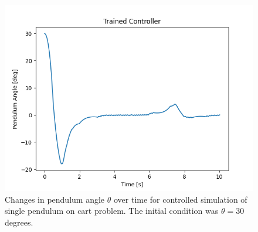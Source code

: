 \documentclass{LTHtwocol} %
\begin{document}
\begin{figure}[H]
	\centering
	\includegraphics[width=0.9\columnwidth]{figures/Pendulum_angle_30.png}
	\caption{Changes in pendulum angle $\theta$ over time for controlled simulation of single pendulum on cart problem. The initial condition was $\theta = 30$ degrees.}
	\label{fig:single_pendulum_outside_training_domain}
\end{figure}







\end{document}
